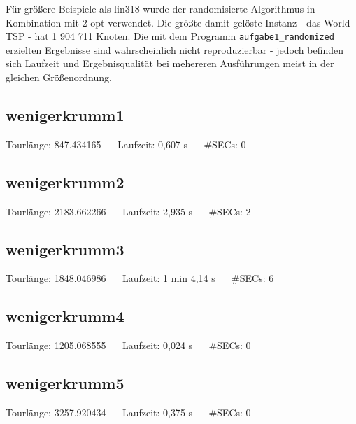 \documentclass[a4paper, 10pt, ngerman]{article}
\begin{document}
Für größere Beispiele als lin318 wurde der randomisierte Algorithmus in Kombination mit 2-opt verwendet. Die größte damit gelöste Instanz - das World TSP - hat 1 904 711 Knoten. Die mit dem Programm \verb|aufgabe1_randomized| erzielten Ergebnisse sind wahrscheinlich nicht reproduzierbar - jedoch befinden sich Laufzeit und Ergebnisqualität bei mehereren Ausführungen meist in der gleichen Größenordnung.

\subsection{wenigerkrumm1}



\noindent Tourlänge: 847.434165 $\quad$ Laufzeit: 0,607 s $\quad$ \#SECs: 0

\subsection{wenigerkrumm2}



\noindent Tourlänge: 2183.662266 $\quad$ Laufzeit: 2,935 s $\quad$ \#SECs: 2

\subsection{wenigerkrumm3}



\noindent Tourlänge: 1848.046986 $\quad$ Laufzeit: 1 min 4,14 s $\quad$ \#SECs: 6

\subsection{wenigerkrumm4}



\noindent Tourlänge: 1205.068555 $\quad$ Laufzeit: 0,024 s $\quad$ \#SECs: 0

\subsection{wenigerkrumm5}



\noindent Tourlänge: 3257.920434 $\quad$ Laufzeit: 0,375 s $\quad$ \#SECs: 0
\medskip
\end{document}
